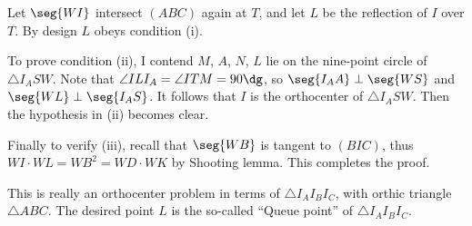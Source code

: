 Let $\seg{WI}$ intersect $(ABC)$ again at $T$, and let $L$ be the reflection of $I$ over $T$. By design $L$ obeys condition (i).

To prove condition (ii), I contend $M$, $A$, $N$, $L$ lie on the nine-point circle of $\triangle I_ASW$. Note that $\angle ILI_A=\angle ITM=90\dg$, so $\seg{I_AA}\perp\seg{WS}$ and $\seg{WL}\perp\seg{I_AS}$. It follows that $I$ is the orthocenter of $\triangle I_ASW$. Then the hypothesis in (ii) becomes clear.

Finally to verify (iii), recall that $\seg{WB}$ is tangent to $(BIC)$, thus $WI\cdot WL=WB^2=WD\cdot WK$ by Shooting lemma. This completes the proof.
\begin{remark}
    This is really an orthocenter problem in terms of $\triangle I_AI_BI_C$, with orthic triangle $\triangle ABC$. The desired point $L$ is the so-called ``Queue point'' of $\triangle I_AI_BI_C$.
\end{remark}
%
%
%
%
%
